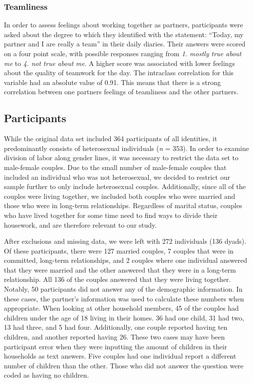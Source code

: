 \documentclass[
  man]{apa6}
\begin{document}
\hypertarget{teamliness}{%
\subsubsection{Teamliness}\label{teamliness}}

In order to assess feelings about working together as partners, participants were asked about the degree to which they identified with the statement: ``Today, my partner and I are really a team'' in their daily diaries. Their answers were scored on a four point scale, with possible responses ranging from \emph{1. mostly true about me} to \emph{4. not true about me}. A higher score was associated with lower feelings about the quality of teamwork for the day. The intraclass correlation for this variable had an absolute value of 0.91. This means that there is a strong correlation between one partners feelings of teamliness and the other partners.

\hypertarget{participants}{%
\subsection{Participants}\label{participants}}

While the original data set included 364 participants of all identities, it predominantly consists of heterosexual individuals (\emph{n} = 353). In order to examine division of labor along gender lines, it was necessary to restrict the data set to male-female couples. Due to the small number of male-female couples that included an individual who was not heterosexual, we decided to restrict our sample further to only include heterosexual couples. Additionally, since all of the couples were living together, we included both couples who were married and those who were in long-term relationships. Regardless of marital status, couples who have lived together for some time need to find ways to divide their housework, and are therefore relevant to our study.

After exclusions and missing data, we were left with 272 individuals (136 dyads). Of these participants, there were 127 married couples, 7 couples that were in committed, long-term relationships, and 2 couples where one individual answered that they were married and the other answered that they were in a long-term relationship. All 136 of the couples answered that they were living together. Notably, 50 participants did not answer any of the demographic information. In these cases, the partner's information was used to calculate these numbers when appropriate. When looking at other household members, 45 of the couples had children under the age of 18 living in their homes. 36 had one child, 31 had two, 13 had three, and 5 had four. Additionally, one couple reported having ten children, and another reported having 26. These two cases may have been participant error when they were inputting the amount of children in their households as text answers. Five couples had one individual report a different number of children than the other. Those who did not answer the question were coded as having no children.
\end{document}
